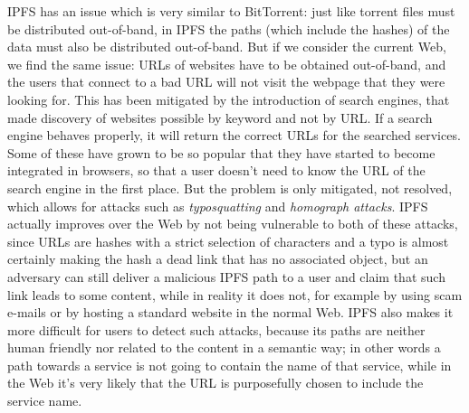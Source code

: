 \documentclass[mscthesis]{usiinfthesis}
\begin{document}
IPFS has an issue which is very similar to BitTorrent: just like torrent files must be distributed out-of-band, in IPFS the paths (which include the hashes) of the data must also be distributed out-of-band. But if we consider the current Web, we find the same issue: URLs of websites have to be obtained out-of-band, and the users that connect to a bad URL will not visit the webpage that they were looking for. This has been mitigated by the introduction of search engines, that made discovery of websites possible by keyword and not by URL. If a search engine behaves properly, it will return the correct URLs for the searched services. Some of these have grown to be so popular that they have started to become integrated in browsers, so that a user doesn't need to know the URL of the search engine in the first place. But the problem is only mitigated, not resolved, which allows for attacks such as \textit{typosquatting} and \textit{homograph attacks}. %
IPFS actually improves over the Web by not being vulnerable to both of these attacks, since URLs are hashes with a strict selection of characters and a typo is almost certainly making the hash a dead link that has no associated object, but an adversary can still deliver a malicious IPFS path to a user and claim that such link leads to some content, while in reality it does not, for example by using scam e-mails or by hosting a standard website in the normal Web. IPFS also makes it more difficult for users to detect such attacks, because its paths are neither human friendly nor related to the content in a semantic way; in other words a path towards a service is not going to contain the name of that service, while in the Web it's very likely that the URL is purposefully chosen to include the service name. %
\end{document}
